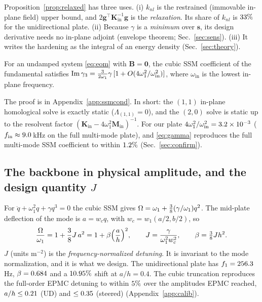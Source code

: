Proposition~\ref{prop:relaxed} has three uses. (i) $k_{nl}$ is the restrained
(immovable in-plane field) upper bound, and $2\bm g^{\!\top}\bm K_{\mathrm{in}}^{-1}\bm g$
is the \emph{relaxation}. Its share of $k_{nl}$ is $33\%$ for the unidirectional
plate. (ii) Because $\gamma$ is a \emph{minimum} over $\bm s$, its design derivative
needs no in-plane adjoint (envelope theorem; Sec.~\ref{sec:sens}). (iii) It writes the
hardening as the integral of an energy density (Sec.~\ref{sec:theory}).

\begin{proposition}\label{prop:ssmcond}
For an undamped system \eqref{eq:eom} with $\bm B=\bm 0$, the cubic SSM coefficient of the
fundamental satisfies
$\operatorname{Im}\gamma_3=\tfrac{3}{2\omega_1}\gamma\,[1+O(4\omega_1^2/\omega_{\mathrm{in}}^2)]$,
where $\omega_{\mathrm{in}}$ is the lowest in-plane frequency.
\end{proposition}
\noindent The proof is in Appendix~\ref{app:ssmcond}. In short: the $(1,1)$ in-plane
homological solve is exactly static ($\Lambda_{(1,1)}=0$), and the $(2,0)$ solve is
static up to the resolvent factor
$(\bm K_{\mathrm{in}}-4\omega_1^2\bm M_{\mathrm{in}})^{-1}$. For our plate
$4\omega_1^2/\omega_{\mathrm{in}}^2=3.2\times10^{-3}$ ($f_{\mathrm{in}}\approx9.0$\,kHz on the full multi-mode plate), and \eqref{eq:gamma} reproduces the full
multi-mode SSM coefficient to within $1.2\%$ (Sec.~\ref{sec:confirm}).

\subsection{The backbone in physical amplitude, and the design quantity $J$}
For $\ddot q+\omega_1^2q+\gamma q^3=0$ the cubic SSM gives
$\Omega=\omega_1+\tfrac38(\gamma/\omega_1)q^2$. The mid-plate deflection of the mode is
$a=w_cq$, with $w_c=w_1(a/2,b/2)$, so
\begin{equation}
\frac{\Omega}{\omega_1}=1+\frac38J\,a^2=1+\beta\Big(\frac{a}{h}\Big)^2,\qquad
J=\frac{\gamma}{\omega_1^2w_c^2},\qquad \beta=\tfrac38Jh^2 .
\label{eq:J}
\end{equation}
$J$ (units m$^{-2}$) is the \emph{frequency-normalized detuning}. It is invariant to the
mode normalization, and it is what we design. The unidirectional plate has
$f_1=256.3$\,Hz, $\beta=0.684$ and a $10.95\%$ shift at $a/h=0.4$.
The cubic truncation reproduces the full-order EPMC detuning to within $5\%$ over the
amplitudes EPMC reached, $a/h\le0.21$ (UD) and $\le0.35$ (steered) (Appendix~\ref{app:calib}).

